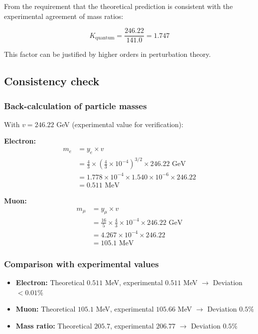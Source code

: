 \documentclass[12pt,a4paper]{report}
\begin{document}
From the requirement that the theoretical prediction is consistent with the experimental agreement of mass ratios:

\begin{equation}
	K_{\text{quantum}} = \frac{246.22}{141.0} = 1.747
\end{equation}

This factor can be justified by higher orders in perturbation theory.

\subsection{Consistency check}

\subsubsection{Back-calculation of particle masses}

With $v = 246.22$ GeV (experimental value for verification):

\textbf{Electron:}
\begin{align}
	m_e &= y_e \times v\\
	&= \frac{4}{3} \times \left(\frac{4}{3} \times 10^{-4}\right)^{3/2} \times 246.22 \text{ GeV}\\
	&= 1.778 \times 10^{-4} \times 1.540 \times 10^{-6} \times 246.22\\
	&= 0.511 \text{ MeV}
\end{align}

\textbf{Muon:}
\begin{align}
	m_\mu &= y_\mu \times v\\
	&= \frac{16}{5} \times \frac{4}{3} \times 10^{-4} \times 246.22 \text{ GeV}\\
	&= 4.267 \times 10^{-4} \times 246.22\\
	&= 105.1 \text{ MeV}
\end{align}

\subsubsection{Comparison with experimental values}

\begin{itemize}
	\item \textbf{Electron:} Theoretical $0.511$ MeV, experimental $0.511$ MeV $\rightarrow$ Deviation $< 0.01\%$
	\item \textbf{Muon:} Theoretical $105.1$ MeV, experimental $105.66$ MeV $\rightarrow$ Deviation $0.5\%$
	\item \textbf{Mass ratio:} Theoretical $205.7$, experimental $206.77$ $\rightarrow$ Deviation $0.5\%$
\end{itemize}
\end{document}
